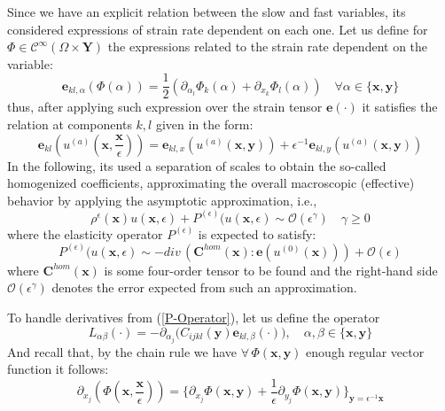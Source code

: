 Since we have an explicit relation between the slow and fast variables, its considered expressions of strain rate dependent on each one. Let us define for $\Phi \in \mathcal{C}^{\infty}(\Omega \times \mathbf{Y})$ the expressions related to the strain rate dependent on the variable:
\begin{equation*}
    \mathbf{e}_{kl,\alpha} (\Phi(\alpha)) = \frac{1}{2}(\partial_{\alpha_l} \Phi_k (\alpha) + \partial_{x_k} \Phi_l (\alpha)) \quad \forall \alpha \in \{\mathbf{x}, \mathbf{y}\}
\end{equation*}
thus, after applying such expression over the strain tensor $\mathbf{e}(\cdot)$ it satisfies the relation at components $k,l$ given in the form:
\begin{equation}
    \label{Multiscale-Strain}
    \mathbf{e}_{kl} ( u^{(a)}(\mathbf{x}, \frac{\mathbf{x}}{\epsilon})) = \mathbf{e}_{kl,x}( u^{(a)} (\mathbf{x},\mathbf{y})) + \epsilon^{-1} \mathbf{e}_{kl,y} (u^{(a)}(\mathbf{x},\mathbf{y}))
\end{equation}
In the following, its used a separation of scales to obtain the so-called homogenized coefficients, approximating the overall macroscopic (effective) behavior by applying the asymptotic approximation, i.e.,
\begin{equation*}
    \rho^{\epsilon}(\mathbf{x}) u(\mathbf{x}, \epsilon) + P^{(\epsilon)}(u(\mathbf{x},\epsilon) \sim \mathcal{O}(\epsilon^{\gamma}) \quad \gamma \geq 0
\end{equation*}
where the elasticity operator $P^{(\epsilon)}$ is expected to satisfy:
\begin{equation}
    \label{P-Operator}
    P^{(\epsilon)}(u(\mathbf{x},\epsilon) \sim - div \, (\mathbf{C}^{hom}(\mathbf{x}): \mathbf{e}(u^{(0)}(\mathbf{x}))) + \mathcal{O}(\epsilon)
\end{equation}
where $\mathbf{C}^{hom}(\mathbf{x})$ is some four-order tensor to be found and the right-hand side $\mathcal{O}(\epsilon^{\gamma})$ denotes the error expected from such an approximation. 

To handle derivatives from (\ref{P-Operator}), let us define the operator 
\begin{equation*}
    L_{\alpha \beta} (\cdot) = - \partial_{\alpha_j} \big( C_{ijkl} (\mathbf{y}) \mathbf{e}_{kl, \beta}(\cdot) \big), \quad \alpha, \beta \in \{ \mathbf{x},\mathbf{y} \}
\end{equation*}
And recall that, by the chain rule we have $\forall \, \Phi(\mathbf{x},\mathbf{y})$ enough regular vector function it follows:
\begin{equation*}
    \partial_{x_j} (\Phi (\mathbf{x}, \frac{\mathbf{x}}{\epsilon})) = \big \{ \partial_{x_j} \Phi (\mathbf{x}, \mathbf{y}) + \frac{1}{\epsilon} \partial_{y_j} \Phi(\mathbf{x},\mathbf{y}) \big \}_{\mathbf{y}= \epsilon^{-1}\mathbf{x}}
\end{equation*}

